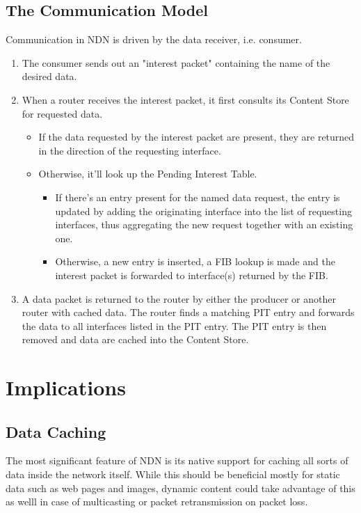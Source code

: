			\subsection{The Communication Model}

			Communication in NDN is driven by the data receiver, i.e. consumer.

			\begin{enumerate}
			\item The consumer sends out an "interest packet" containing the name of the desired data.
			\item When a router receives the interest packet, it first consults its Content Store for requested data.
				\begin{itemize}
				\item If the data requested by the interest packet are present, they are returned in the direction of the requesting interface.
				\item Otherwise, it'll look up the Pending Interest Table.
					\begin{itemize}
					\item If there's an entry present for the named data request, the entry is updated by adding the originating interface into the list of requesting interfaces, thus aggregating the new request together with an existing one.
					\item Otherwise, a new entry is inserted, a FIB lookup is made and the interest packet is forwarded to interface(s) returned by the FIB.
					\end{itemize}
				\end{itemize}
			\item A data packet is returned to the router by either the producer or another router with cached data. The router finds a matching PIT entry and forwards the data to all interfaces listed in the PIT entry. The PIT entry is then removed and data are cached into the Content Store.
			\end{enumerate}

	\section{Implications}
		\subsection{Data Caching}
			The most significant feature of NDN is its native support for caching all sorts of data inside the network itself. While this should be beneficial mostly for static data such as web pages and images, dynamic content could take advantage of this as welll in case of multicasting or packet retransmission on packet loss.

